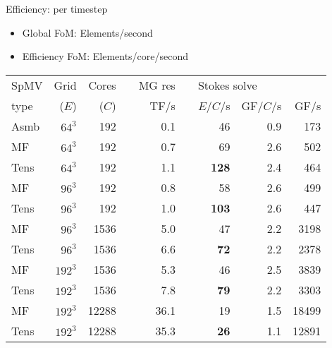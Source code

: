 \documentclass{beamer}
\begin{document}
\begin{frame}{Efficiency: per timestep}
  \begin{itemize}
  \item Global FoM: Elements/second
  \item Efficiency FoM: Elements/core/second
  \end{itemize}
    \begin{tabular}{lr r cr crrr}
    \toprule
    SpMV    &Grid  &Cores    &&{MG res}  &&\multicolumn{3}{l}{{Stokes solve}}      \\
    type         &($E$)    &($C$)        &&TF/s       & &$E$/$C$/s    &GF/$C$/s     &GF/s   \\
    \midrule
    Asmb    &$64^3$  &192     &&0.1       &&46 &0.9 &173          \\
    MF        &$64^3$  &192    &&0.7        &&69 &2.6 &502           \\
    Tens      &$64^3$  &192    &&1.1    &&{\bf 128} &2.4 &464          \\
    \midrule
    MF         &$96^3$   &192     &&0.8      &&58 &2.6 &499           \\
    Tens       &$96^3$  &192     &&1.0     &&{\bf 103} &2.6 &447  \\
    \midrule
    MF           &$96^3$   &1536      &&5.0    &&47 &2.2 &3198    \\
    Tens         &$96^3$   &1536     &&6.6   &&{\bf 72} &2.2 &2378   \\
    \midrule
    MF         &$192^3$   &1536    &&5.3   &&46 &2.5 &3839         \\
    Tens       &$192^3$  &1536     &&7.8   &&{\bf 79} &2.2 &3303   \\
    \midrule
    MF           &$192^3$  &12288  &&36.1   &&19  &1.5 &18499  \\
    Tens        &$192^3$  &12288  &&35.3   &&{\bf 26} &1.1 &12891  \\
    \bottomrule
  \end{tabular}
\end{frame}
\end{document}
